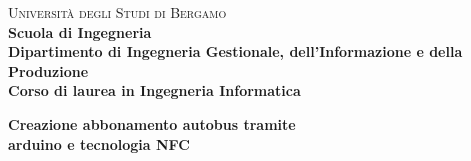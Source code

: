\begin{titlepage}

        \noindent
        \begin{minipage}[t]{0.19\textwidth}
        \end{minipage}
        \begin{minipage}[t]{0.81\textwidth}
        {
                {\textsc{Università degli Studi di Bergamo}} \\
                \textbf{Scuola di Ingegneria} \\
                \textbf{Dipartimento di Ingegneria Gestionale, dell'Informazione e della Produzione} \\
                \textbf{Corso di laurea in Ingegneria Informatica} \\
                \par
        }
        \end{minipage}

	\vspace{40mm}

	\begin{center}
            {\LARGE{
                    \textbf{Creazione abbonamento autobus tramite \\arduino e tecnologia NFC}
                    \par
            }}
        \end{center}


\end{titlepage}
